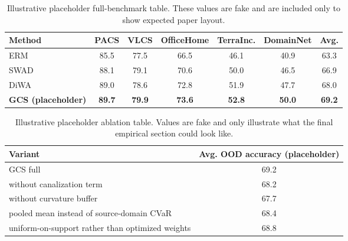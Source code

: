 \documentclass[11pt]{article}
\newcommand{\1}{\mathbf{1}}
\theoremstyle{plain}
\theoremstyle{definition}
\theoremstyle{remark}
\begin{document}
\begin{table}[p]
\centering
\caption{Illustrative placeholder full-benchmark table. These values are fake and are included only to show expected paper layout.}
\vspace{0.4em}
\begin{tabular}{lcccccc}
\toprule
Method & PACS & VLCS & OfficeHome & TerraInc. & DomainNet & Avg. \\
\midrule
ERM & 85.5 & 77.5 & 66.5 & 46.1 & 40.9 & 63.3 \\
SWAD & 88.1 & 79.1 & 70.6 & 50.0 & 46.5 & 66.9 \\
DiWA & 89.0 & 78.6 & 72.8 & 51.9 & 47.7 & 68.0 \\
\textbf{GCS (placeholder)} & \textbf{89.7} & \textbf{79.9} & \textbf{73.6} & \textbf{52.8} & \textbf{50.0} & \textbf{69.2} \\
\bottomrule
\end{tabular}
\end{table}

\begin{table}[p]
\centering
\caption{Illustrative placeholder ablation table. Values are fake and only illustrate what the final empirical section could look like.}
\vspace{0.4em}
\begin{tabular}{lc}
\toprule
Variant & Avg. OOD accuracy (placeholder) \\
\midrule
GCS full & 69.2 \\
without canalization term & 68.2 \\
without curvature buffer & 67.7 \\
pooled mean instead of source-domain CVaR & 68.4 \\
uniform-on-support rather than optimized weights & 68.8 \\
\bottomrule
\end{tabular}
\end{table}
\end{document}
